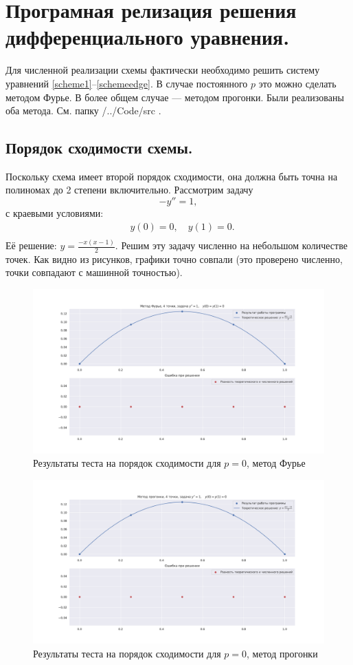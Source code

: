 \documentclass[14pt,a4paper]{extarticle}
\newcommand{\1}{\mathbbm{1}}
\begin{document}
\section{Програмная релизация решения дифференциального уравнения.}
Для численной реализации схемы фактически необходимо решить систему уравнений \eqref{scheme1}--\eqref{schemeedge}. 
В случае постоянного $p$ это можно сделать методом Фурье. В более общем случае --- методом прогонки. Были реализованы оба метода. См. папку /../Code/src .
\subsection{Порядок сходимости схемы.}
Поскольку схема имеет второй порядок сходимости, она должна быть точна на полиномах до 2 степени включительно. Рассмотрим задачу
\begin{equation*} 
    -y'' = 1,
\end{equation*}
с краевыми условиями:
\begin{align*} 
    & y(0) = 0, \quad y(1) = 0. \\
\end{align*}
Её решение: $y = \frac{-x(x-1)}{2}$. Решим эту задачу численно на небольшом количестве точек. Как видно из рисунков, графики точно совпали 
(это проверено численно, точки совпадают с машинной точностью).
\begin{figure}
    \centering
    \includegraphics[scale=0.4]{figs/f4p0f1.pdf}
    \caption{Результаты теста на порядок сходимости для $p=0$, метод Фурье}
\end{figure}

\begin{figure}
    \centering
    \includegraphics[scale=0.4]{figs/s4p0f1.pdf}
    \caption{Результаты теста на порядок сходимости для $p=0$, метод прогонки}
\end{figure}
\end{document}

